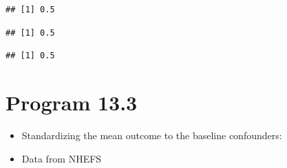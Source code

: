 \documentclass[
  10pt,
]{book}
\newenvironment{Shaded}{\begin{snugshade}}{\end{snugshade}}
\newcommand{\DecValTok}[1]{\textcolor[rgb]{0.00,0.00,0.81}{#1}}
\newcommand{\FunctionTok}[1]{\textcolor[rgb]{0.00,0.00,0.00}{#1}}
\newcommand{\NormalTok}[1]{#1}
\newcommand{\SpecialCharTok}[1]{\textcolor[rgb]{0.00,0.00,0.00}{#1}}
\providecommand{\tightlist}{%
  \setlength{\itemsep}{0pt}\setlength{\parskip}{0pt}}
\begin{document}
\begin{verbatim}
## [1] 0.5
\end{verbatim}

\begin{Shaded}
\end{Shaded}

\begin{verbatim}
## [1] 0.5
\end{verbatim}

\begin{Shaded}
\end{Shaded}

\begin{verbatim}
## [1] 0.5
\end{verbatim}

\hypertarget{program-13.3}{%
\section{Program 13.3}\label{program-13.3}}

\begin{itemize}
\tightlist
\item
  Standardizing the mean outcome to the baseline confounders:
\item
  Data from NHEFS
\end{itemize}
\end{document}
